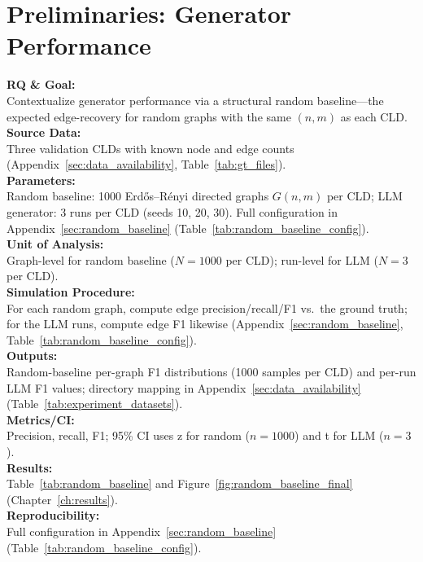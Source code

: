 \section{Preliminaries: Generator Performance}
\label{sec:random_baseline_method}

\noindent\textbf{RQ \& Goal:}\\
Contextualize generator performance via a structural random baseline---the expected edge-recovery for random graphs with the same $(n,m)$ as each CLD.\\
\textbf{Source Data:}\\
Three validation CLDs with known node and edge counts (Appendix~\ref{sec:data_availability}, Table~\ref{tab:gt_files}).\\
\textbf{Parameters:}\\
Random baseline: 1000 Erd\H{o}s--R\'enyi directed graphs $G(n,m)$ per CLD; LLM generator: 3 runs per CLD (seeds 10, 20, 30). Full configuration in Appendix~\ref{sec:random_baseline} (Table~\ref{tab:random_baseline_config}).\\
\textbf{Unit of Analysis:}\\
Graph-level for random baseline ($N=1000$ per CLD); run-level for LLM ($N=3$ per CLD).\\
\textbf{Simulation Procedure:}\\
For each random graph, compute edge precision/recall/F1 vs.\ the ground truth; for the LLM runs, compute edge F1 likewise (Appendix~\ref{sec:random_baseline}, Table~\ref{tab:random_baseline_config}).\\
\textbf{Outputs:}\\
Random-baseline per-graph F1 distributions (1000 samples per CLD) and per-run LLM F1 values; directory mapping in Appendix~\ref{sec:data_availability} (Table~\ref{tab:experiment_datasets}).\\
\textbf{Metrics/CI:}\\
Precision, recall, F1; 95\% CI uses z for random ($n{=}1000$) and t for LLM ($n{=}3$).\\
\textbf{Results:}\\
Table~\ref{tab:random_baseline} and Figure~\ref{fig:random_baseline_final} (Chapter~\ref{ch:results}).\\
\textbf{Reproducibility:}\\
Full configuration in Appendix~\ref{sec:random_baseline} (Table~\ref{tab:random_baseline_config}).

